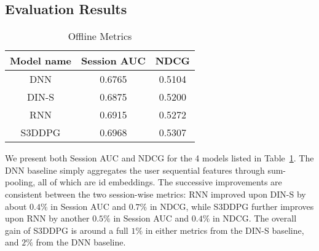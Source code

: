 
\subsection{Evaluation Results}


\begin{table}[htbp] 
\centering
\caption{Offline Metrics}
\begin{tabular}{c|c|c}
\hline
Model name & Session AUC & NDCG \\
\hline
DNN & 0.6765 & 0.5104 \\
DIN-S & 0.6875 & 0.5200 \\
RNN & 0.6915 & 0.5272 \\
S3DDPG & 0.6968 & 0.5307 \\
\hline
\end{tabular}
\label{tab:offline_metrics}
\end{table}
We present both Session AUC and NDCG for the 4 models listed in Table~\ref{tab:offline_metrics}. The DNN baseline simply aggregates the user sequential features through sum-pooling, all of which are id embeddings. The successive improvements are consistent between the two session-wise metrics: RNN improved upon DIN-S by about $0.4\%$ in Session AUC and $0.7\%$ in NDCG, while S3DDPG further improves upon RNN by another $0.5\%$ in Session AUC and $0.4\%$ in NDCG. The overall gain of S3DDPG is around a full $1\%$ in either metrics from the DIN-S baseline, and $2\%$ from the DNN baseline.


